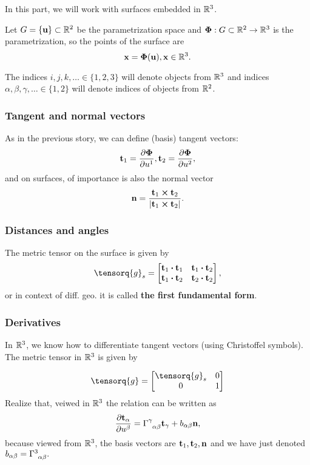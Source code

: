 \documentclass[reqno, a4paper]{article}
\begin{document}
In this part, we will work with surfaces embedded in ${\mathbb R}^3$.

Let $G = \{\vb{u}\} \subset {\mathbb R}^2 $ be the parametrization space and $\vb*{\Phi}:G \subset {\mathbb R}^2 \to {\mathbb R}^3$ is the parametrization, so the points of the surface are
\[
	\vb{x}=\vb*{\Phi}\qty(\vb{u}), \vb{x} \in {\mathbb R}^3.
\]

\begin{definition}
	The indices $i,j,k, \dots \in \{1,2,3\}$ will denote objects from ${\mathbb R}^3$ and indices $\alpha, \beta, \gamma, \dots \in \{1,2\}$ will denote indices of objects from ${\mathbb R}^2$.
\end{definition}

\subsubsection{Tangent and normal vectors}
\label{sec:tangent_normal_vectors}
As in the previous story, we can define (basis) tangent vectors:
\[
	\vb{t}_1 = \pdv{\vb*{\Phi}}{u^1}, \vb{t}_2 = \pdv{\vb*{\Phi}}{u^2},
\]
and on surfaces, of importance is also the normal vector
\[
	\vb{n}=\frac{\vb{t}_1 \cross \vb{t}_2}{|\vb{t}_1 \cross \vb{t}_2|}.
\]

\subsubsection{Distances and angles}
\label{sec:distances_angles}

The metric tensor on the surface is given by
\[
	\tensorq{g}_s = \begin{bmatrix} \vb{t}_1 \vdot \vb{t}_1 & \vb{t}_1 \vdot \vb{t}_2 \\ \vb{t}_1 \vdot \vb{t}_2 & \vb{t}_2 \vdot \vb{t}_2 \end{bmatrix},
\]
or in context of diff. geo. it is called \textbf{the first fundamental form}.

\subsubsection{Derivatives}
\label{sec:derivatives_on_surfaces}
In ${\mathbb R}^3$, we know how to differentiate tangent vectors (using Christoffel symbols).
The metric tensor in ${\mathbb R}^3$ is given by 

\[
	\tensorq{g} = 
	\begin{bmatrix}
		\tensorq{g}_s & 0 \\
		0 & 1 
	\end{bmatrix}
\]
Realize that, veiwed in ${\mathbb R}^3$ the relation can be written as
\[
	\pdv{\vb{t}_{\alpha}}{u^{\beta}} = \Gamma \indices{^\gamma_{\alpha \beta}} \vb{t}_{\gamma}+b_{\alpha \beta} \vb{n},
\]
because viewed from ${\mathbb R}^3$, the basis vectors are $\vb{t}_1, \vb{t}_2, \vb{n}$ and we have just denoted $b_{\alpha \beta} = \Gamma \indices{^3 _{\alpha \beta}}.$
\end{document}
